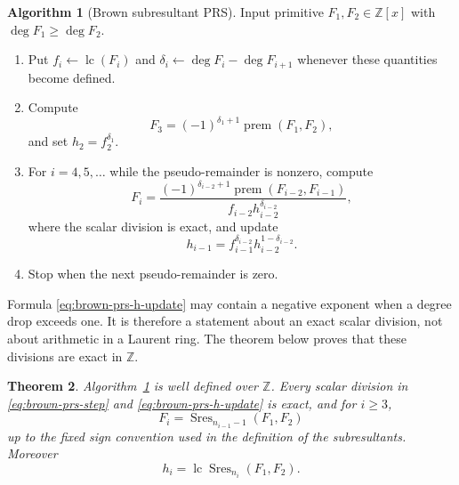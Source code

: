 \documentclass[11pt]{book}
\newtheorem{theorem}{Theorem}[section]
\theoremstyle{definition}
\newtheorem{algorithm}[theorem]{Algorithm}
\newcommand{\ZZ}{\mathbb Z}
\begin{document}
\begin{algorithm}[Brown subresultant PRS]
\label{alg:brown-subresultant-prs}
Input primitive $F_1,F_2\in\ZZ[x]$ with
$\deg F_1\ge\deg F_2$.
\begin{enumerate}
 \item Put $f_i\leftarrow\operatorname{lc}(F_i)$ and
 $\delta_i\leftarrow\deg F_i-\deg F_{i+1}$ whenever these quantities become
 defined.
 \item Compute
 \begin{equation}\label{eq:brown-first-remainder}
  F_3=(-1)^{\delta_1+1}
      \operatorname{prem}(F_1,F_2),
 \end{equation}
 and set $h_2=f_2^{\delta_1}$.
 \item For $i=4,5,\ldots$ while the pseudo-remainder is nonzero, compute
 \begin{equation}\label{eq:brown-prs-step}
  F_i=
  \frac{(-1)^{\delta_{i-2}+1}
        \operatorname{prem}(F_{i-2},F_{i-1})}
       {f_{i-2}h_{i-2}^{\delta_{i-2}}},
 \end{equation}
 where the scalar division is exact, and update
 \begin{equation}\label{eq:brown-prs-h-update}
  h_{i-1}
  =f_{i-1}^{\delta_{i-2}}
   h_{i-2}^{1-\delta_{i-2}}.
 \end{equation}
 \item Stop when the next pseudo-remainder is zero.
\end{enumerate}
\end{algorithm}

Formula \eqref{eq:brown-prs-h-update} may contain a negative exponent when a
degree drop exceeds one.  It is therefore a statement about an exact scalar
division, not about arithmetic in a Laurent ring.  The theorem below proves
that these divisions are exact in $\ZZ$.

\begin{theorem}\label{thm:brown-subresultant-prs-correct}
Algorithm~\ref{alg:brown-subresultant-prs} is well defined over $\ZZ$.  Every
scalar division in \eqref{eq:brown-prs-step} and
\eqref{eq:brown-prs-h-update} is exact, and for $i\ge3$,
\begin{equation}\label{eq:brown-prs-is-subresultant}
 F_i=\operatorname{Sres}_{n_{i-1}-1}(F_1,F_2)
\end{equation}
up to the fixed sign convention used in the definition of the
subresultants.  Moreover
\begin{equation}\label{eq:brown-h-is-subresultant-lc}
 h_i=\operatorname{lc}
 \operatorname{Sres}_{n_i}(F_1,F_2).
\end{equation}
\end{theorem}
\end{document}
